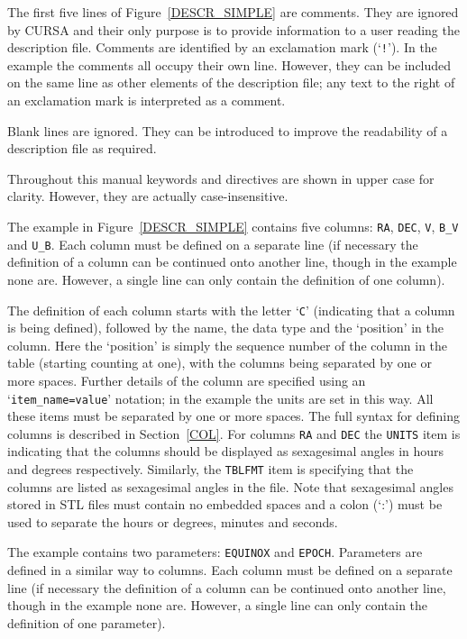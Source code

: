 \documentclass[twoside,11pt]{starlink}
\begin{document}
The first five lines of Figure~\ref{DESCR_SIMPLE} are
comments.  They are ignored by CURSA and their only purpose is to
provide information to a user reading the description file.  Comments
are identified by an exclamation mark (`\texttt{!}').  In the example the
comments all occupy their own line.  However, they can be included on
the same line as other elements of the description file; any text to
the right of an exclamation mark is interpreted as a comment.

Blank lines are ignored.  They can be introduced to improve the
readability of a description file as required.

Throughout this manual keywords and directives are shown in upper
case for clarity.  However, they are actually case-insensitive.

The example in Figure~\ref{DESCR_SIMPLE} contains five columns:
\texttt{RA}, \texttt{DEC}, \texttt{V}, \texttt{B\_V} and \texttt{U\_B}.  Each column
must be defined on a separate line (if necessary the definition of a
column can be continued onto another line, though in the example none
are.  However, a single line can only contain the definition of one
column).

The definition of each column starts with the letter `\texttt{C}'
(indicating that a column is being defined), followed by the name, the
data type and the `position' in the column.  Here the `position' is
simply the sequence number of the column in the table (starting counting
at one), with the columns being separated by one or more spaces.  Further
details of the column are specified using an `\texttt{item\_name=value}'
notation; in the example the units are set in this way.  All these items
must be separated by one or more spaces.  The full syntax for defining
columns is described in Section~\ref{COL}.  For columns \texttt{RA} and
\texttt{DEC} the \texttt{UNITS} item is indicating that the columns should be
displayed as sexagesimal angles in hours and degrees respectively.
Similarly, the \texttt{TBLFMT} item is specifying that the columns are
listed as sexagesimal angles in the file.  Note that sexagesimal angles
stored in STL files must contain no embedded spaces and a colon (`:')
must be used to separate the hours or degrees, minutes and seconds.

The example contains two parameters: \texttt{EQUINOX} and \texttt{EPOCH}.
Parameters are defined in a similar way to columns.  Each column
must be defined on a separate line (if necessary the definition of a
column can be continued onto another line, though in the example none
are.  However, a single line can only contain the definition of one
parameter).
\end{document}
